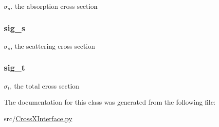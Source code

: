 $\sigma_a$, the absorption cross section 

\hypertarget{classsrc_1_1_cross_x_interface_1_1_cross_x_interface_afb10e3cd4777a9b381a31a32071fc0d1}{
\subsubsection[{sig\-\_\-s}]{\setlength{\rightskip}{0pt plus 5cm}sig\-\_\-s}}\label{classsrc_1_1_cross_x_interface_1_1_cross_x_interface_afb10e3cd4777a9b381a31a32071fc0d1}


$\sigma_s$, the scattering cross section 

\hypertarget{classsrc_1_1_cross_x_interface_1_1_cross_x_interface_a9aa02ff48c273c3bc0a8213a045e6f4e}{
\subsubsection[{sig\-\_\-t}]{\setlength{\rightskip}{0pt plus 5cm}sig\-\_\-t}}\label{classsrc_1_1_cross_x_interface_1_1_cross_x_interface_a9aa02ff48c273c3bc0a8213a045e6f4e}


$\sigma_t$, the total cross section 



The documentation for this class was generated from the following file\-:\begin{DoxyCompactItemize}
\item 
src/\hyperlink{_cross_x_interface_8py}{Cross\-X\-Interface.\-py}\end{DoxyCompactItemize}

